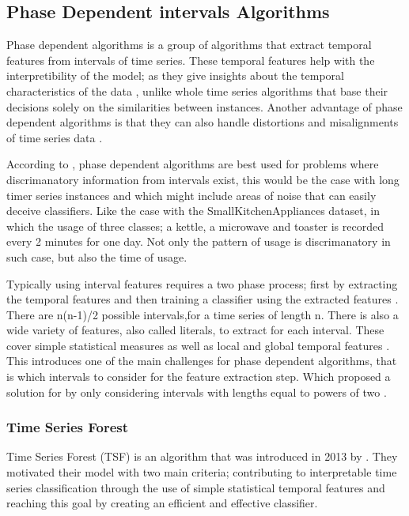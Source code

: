 \subsection{Phase Dependent intervals Algorithms}
\label{SubsectionPhaseDependent}
Phase dependent algorithms is a group of algorithms that extract temporal features from intervals of time series.
These temporal features help with the interpretibility of the model; as they give insights about the temporal characteristics of the data \cite{baydogan2016time},
unlike whole time series algorithms that base their decisions solely on the similarities between instances.
Another advantage of phase dependent algorithms is that they can also handle distortions and misalignments of time series data \cite{deng2013time}.

According to \cite{bagnall2017great}, phase dependent algorithms are best used for problems where discrimanatory information from intervals exist,
this would be the case with long timer series instances and which might include areas of noise that can easily deceive classifiers.
Like the case with the SmallKitchenAppliances dataset, in which the usage of three classes; a kettle, a microwave and toaster is recorded every 2 minutes for one day.
Not only the pattern of usage is discrimanatory in such case, but also the time of usage.

Typically using interval features requires a two phase process; first by extracting the temporal features and then training a classifier using the extracted features \cite{deng2013time}.
There are n(n-1)/2 possible intervals,for a time series of length n\cite{bagnall2017great}.
There is also a wide variety of features, also called literals, to extract for each interval. These cover simple statistical measures as well as local and global temporal features \cite{santos2016literature,rodriguez2004support,deng2013time}.
This introduces one of the main challenges for phase dependent algorithms, that is which intervals to consider for the feature extraction step.
Which \cite{rodriguez2004support} proposed a solution for by only considering intervals with lengths equal to powers of two \cite{bagnall2017great}.

\subsubsection{Time Series Forest}
\label{SubsubsectionTimeSeriesForest}
Time Series Forest (TSF) is an algorithm that was introduced in 2013 by \cite{deng2013time}.
They motivated their model with two main criteria; contributing to interpretable time series classification through
the use of simple statistical temporal features and reaching this goal by creating an efficient and effective classifier.

